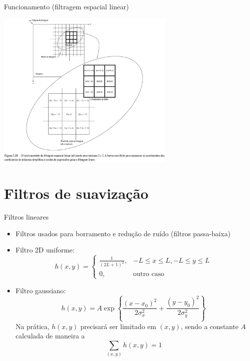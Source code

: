    \begin{slide}[toc=]{Funcionamento (filtragem espacial linear)}
      \begin{center}
          \includegraphics[width=0.65\textwidth]{figs/fig0328}
      \end{center}
   \end{slide}
   
   \section[ slide = true]{Filtros de suavização}
      \begin{slide}[toc=]{Filtros lineares}
         \begin{itemize}[type=1]
            \item Filtros usados para borramento e redução de ruído (filtros passa-baixa)
            \item Filtro 2D uniforme: \begin{equation*}h(x,y)=\begin{cases}\frac{1}{(2L+1)^2},& -L\leq x\leq L, -L \leq y \leq L\\
                                                           0, & \text{outro caso}\end{cases}\end{equation*}
            \item Filtro gaussiano: 
            \begin{equation*}
               h(x,y)=A \exp\left \{\frac{(x-x_0)^2}{2\sigma_x^2}+\frac{(y-y_0)^2}{2\sigma_y^2}\right\}
            \end{equation*}
            Na prática, $h(x,y)$ precisará ser limitado em $(x,y)$, sendo a constante $A$ calculada de maneira a  
            \begin{equation*}
               \sum_{(x,y)}h(x,y) = 1
            \end{equation*}
         \end{itemize}
      \end{slide}
      
